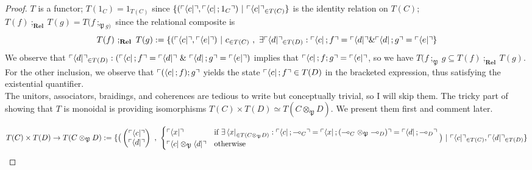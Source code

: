 \begin{theorem}
\begin{proof}
$T$ is a functor; $T(1_C) = 1_{T(C)}$ since $\{(\ulcorner \bra{c} \urcorner, \ulcorner \bra{c};1_C \urcorner) \ | \ \ulcorner \bra{c} \urcorner_{\in T(C)}\}$ is the identity relation on $T(C)$; $T(f) \ ;_\textbf{Rel} \ T(g) = T(f \ ;_{\mathfrak{P} \ g)}$ since the relational composite is
$$T(f) \ ;_\textbf{Rel} \ T(g) := \{(\ulcorner \bra{c} \urcorner, \ulcorner \bra{e} \urcorner) \ | \ c_{\in T(C)} \ , \ \exists \ulcorner \bra{d} \urcorner_{\in T(D)} : \ulcorner \bra{c};f \urcorner = \ulcorner \bra{d} \urcorner \& \ulcorner \bra{d};g \urcorner = \ulcorner \bra{e} \urcorner\}$$ We observe that $\ulcorner \bra{d} \urcorner_{\in T(D)} : (\ulcorner \bra{c};f \urcorner = \ulcorner \bra{d} \urcorner \ \& \ \ulcorner \bra{d};g \urcorner = \ulcorner \bra{e} \urcorner)$ implies that $\ulcorner \bra{c};f;g \urcorner = \ulcorner \bra{e} \urcorner$, so we have $T(f \ ;_{\mathfrak{P}} \ g \subseteq T(f) \ ;_\textbf{Rel} \ T(g)$. For the other inclusion, we observe that $\ulcorner (\bra{c};f);g \urcorner$ yields the state $\ulcorner \bra{c};f \urcorner \in T(D)$ in the bracketed expression, thus satisfying the existential quantifier.\\

The unitors, associators, braidings, and coherences are tedious to write but conceptually trivial, so I will skip them. The tricky part of showing that $T$ is monoidal is providing isomorphisms $T(C) \times T(D) \simeq T(C \otimes_\mathfrak{P} D)$. We present them first and comment later.

\[T(C) \times T(D) \rightarrow T(C \otimes_\mathfrak{P} D) := \{ \big( \begin{pmatrix} \ulcorner \bra{c} \urcorner \\ \ulcorner \bra{d} \urcorner \end{pmatrix} \ , \ \begin{cases}\centering \ulcorner \bra{x} \urcorner & \text{if } \exists \bra{x}_{\in T(C \otimes_\mathfrak{P} D)} : \ulcorner \bra{c};\multimap_C \urcorner = \ulcorner \bra{x};(\multimap_C \otimes_\mathfrak{P} \multimap_{D}) \urcorner = \ulcorner \bra{d};\multimap_D \urcorner \\ \ulcorner \bra{c} \otimes_\mathfrak{P} \bra{d} \urcorner & \text{otherwise} \end{cases} \big) \ | \ \ulcorner \bra{c} \urcorner_{\in T(C)}, \ulcorner \bra{d} \urcorner_{\in T(D)} \}\]


\end{proof}
\end{theorem}
